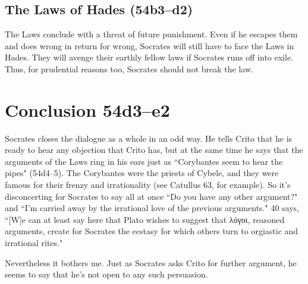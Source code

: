 \documentclass[12pt,letterpaper]{article}
\begin{document}
\subsection*{The Laws of Hades (54b3--d2)}

The Laws conclude with a threat of future punishment. Even if he escapes them and does wrong in return for wrong, Socrates will still have to face the Laws in Hades. They will avenge their earthly fellow laws if Socrates runs off into exile. Thus, for prudential reasons too, Socrates should not break the law.


\section*{Conclusion 54d3--e2}

Socrates closes the dialogue as a whole in an odd way. He tells Crito that he is ready to hear any objection that Crito has, but at the same time he says that the arguments of the Laws ring in his ears just as ``Corybantes seem to hear the pipes" (54d4--5). The Corybantes were the priests of Cybele, and they were famous for their frenzy and irrationality (see Catullus 63, for example). So it's disconcerting for Socrates to say all at once ``Do you have any other argument?" and ``I'm carried away by the irrational love of the previous arguments." \cite{rose1983} 40 says, ``[W]e can at least say here that Plato wishes to suggest that \textgreek{λόγοι}, reasoned arguments, create for Socrates the ecstasy for which others turn to orgiastic and irrational rites."

Nevertheless it bothers me. Just as Socrates asks Crito for further argument, he seems to say that he's not open to any such persuasion.

\newpage
\pagestyle{references}
\nocite{burnet1903}
\printbibliography[filter=sources,title={Ancient Sources: Editions, Translations, Commentaries}]
\printbibliography[filter=secondary,title=Secondary Literature]
\end{document}
